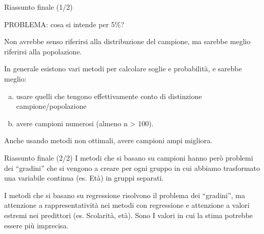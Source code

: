 \documentclass[
  ignorenonframetext,
]{beamer}
\begin{document}
\begin{frame}{Riassunto finale (1/2)}
\label{riassunto-finale-12-1}
\begin{center}
PROBLEMA: cosa si intende per 5\%? 
\end{center}

Non avrebbe senso riferirsi alla distribuzione del campione, ma sarebbe
meglio riferirsi alla popolazione.

In generale esistono vari metodi per calcolare soglie e probabilità, e
sarebbe meglio:

\begin{enumerate}
[a)]
\item
  usare quelli che tengono effettivamente conto di distinzione
  campione/popolazione
\item
  avere campioni numerosi (almeno n \textgreater{} 100).
\end{enumerate}

Anche usando metodi non ottimali, avere campioni ampi migliora.
\end{frame}

\begin{frame}{Riassunto finale (2/2)}
\label{riassunto-finale-22}
I metodi che si basano su campioni hanno però problemi dei ``gradini''
che si vengono a creare per ogni gruppo in cui abbiamo trasformato una
variabile continua (es. Età) in gruppi separati.

I metodi che si basano su regressione risolvono il problema dei
``gradini'', ma attenzione a rappresentatività nei metodi con
regressione e attenzione a valori estremi nei predittori (es. Scolarità,
età). Sono I valori in cui la stima potrebbe essere più imprecisa.
\end{frame}
\end{document}
